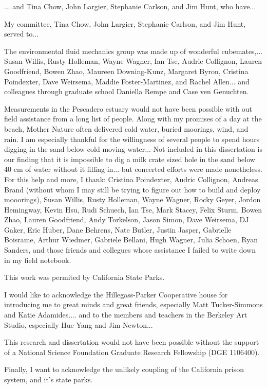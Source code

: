 

... and Tina Chow, John Largier, Stephanie Carlson, and Jim Hunt, who have... 

My committee, Tina Chow, John Largier, Stephanie Carlson, and Jim Hunt, served to... 

The environmental fluid mechanics group was made up of wonderful cubemates,... Susan Willis, Rusty Holleman, Wayne Wagner, Ian Tse, Audric Collignon, Lauren Goodfriend, Bowen Zhao, Maureen Downing-Kunz, Margaret Byron, Cristina Poindexter, Dave Weirsema, Maddie Foster-Martinez, and Rachel Allen... and colleagues through graduate school Daniella Rempe and Case ven Genuchten. 

Measurements in the Pescadero estuary would not have been possible with out field assistance from a long list of people. Along with my promises of a day at the beach, Mother Nature often delivered cold water, buried moorings, wind, and rain. I am especially thankful for the willingness of several people to spend hours digging in the sand below cold moving water... Not included in this dissertation is our finding that it is impossible to dig a milk crate sized hole in the sand below 40 cm of water without it filling in... but concerted efforts were made nonetheless.  For this help and more, I thank: Cristina Poindexter, Audric Collignon, Andreas Brand (without whom I may still be trying to figure out how to build and deploy mooorings), Susan Willis, Rusty Holleman, Wayne Wagner, Rocky Geyer, Jordon Hemingway, Kevin Hsu, Rudi Schuech, Ian Tse, Mark Stacey, Felix Sturm, Bowen Zhao, Lauren Goodfriend, Andy Torkelson, Jason Simon, Dave Weirsema, DJ Gaker, Eric Huber, Dane Behrens, Nate Butler, Justin Jasper, Gabrielle Boisrame, Arthur Wiedmer, Gabriele Bellani, Hugh Wagner, Julia Schoen, Ryan Sanders, and those friends and collegues whose assistance I failed to write down in my field notebook. 

This work was permited by California State Parks.

I would like to acknowledge the Hillegass-Parker Cooperative house for introducing me to great minds and great friends, especially Matt Tucker-Simmons and Katie Adamides.... and to the members and teachers in the Berkeley Art Studio, especially Hue Yang and Jim Newton...

This research and dissertation would not have been possible without the support of a National Science Foundation Graduate Research Fellowship (DGE 1106400).

Finally, I want to acknowledge the unlikely coupling of the California prison system, and it's state parks. 